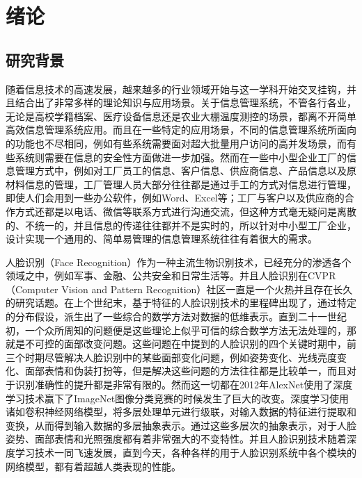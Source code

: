 \section{绪论}
\setlength{\baselineskip}{20pt}
\fancyhf{}
\renewcommand{\headrulewidth}{0.5pt}

\subsection{研究背景}

随着信息技术的高速发展，越来越多的行业领域开始与这一学科开始交叉挂钩，并且结合出了非常多样的理论知识与应用场景。关于信息管理系统，不管各行各业，无论是高校学籍档案、医疗设备信息还是农业大棚温度测控的场景，都离不开简单高效信息管理系统应用。而且在一些特定的应用场景，不同的信息管理系统所面向的功能也不尽相同，例如有些系统需要面对超大批量用户访问的高并发场景，而有些系统则需要在信息的安全性方面做进一步加强。然而在一些中小型企业工厂的信息管理方式中，例如对工厂员工的信息、客户信息、供应商信息、产品信息以及原材料信息的管理，工厂管理人员大部分往往都是通过手工的方式对信息进行管理，即使人们会用到一些办公软件，例如Word、Excel等；工厂与客户以及供应商的合作方式还都是以电话、微信等联系方式进行沟通交流，但这种方式毫无疑问是离散的、不统一的，并且信息的传递往往都并不是实时的，所以针对中小型工厂企业，设计实现一个通用的、简单易管理的信息管理系统往往有着很大的需求。

人脸识别（Face Recognition）作为一种主流生物识别技术，已经充分的渗透各个领域之中，例如军事、金融、公共安全和日常生活等。并且人脸识别在CVPR（Computer Vision and Pattern Recognition）社区一直是一个火热并且存在长久的研究话题。在上个世纪末，基于特征的人脸识别技术的里程碑出现了，通过特定的分布假设，派生出了一些综合的数学方法对数据的低维表示。直到二十一世纪初，一个众所周知的问题便是这些理论上似乎可信的综合数学方法无法处理的，那就是不可控的面部改变问题。这些问题在\cite{deepfrsurvey}中提到的人脸识别的四个关键时期中，前三个时期尽管解决人脸识别中的某些面部变化问题，例如姿势变化、光线亮度变化、面部表情和伪装打扮等，但是解决这些问题的方法往往都是比较单一，而且对于识别准确性的提升都是非常有限的。然而这一切都在2012年AlexNet使用了深度学习技术赢下了ImageNet图像分类竞赛的时候发生了巨大的改变。深度学习使用诸如卷积神经网络模型，将多层处理单元进行级联，对输入数据的特征进行提取和变换，从而得到输入数据的多层抽象表示。通过这些多层次的抽象表示，对于人脸姿势、面部表情和光照强度都有着非常强大的不变特性。并且人脸识别技术随着深度学习技术一同飞速发展\cite{s4}，直到今天，各种各样的用于人脸识别系统中各个模块的网络模型，都有着超越人类表现的性能。


